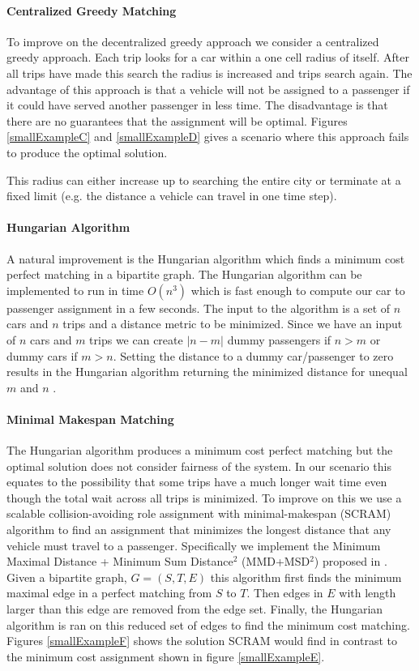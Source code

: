 \documentclass[letterpaper]{article}
\begin{document}
\paragraph{Centralized Greedy Matching}
To improve on the decentralized greedy approach we consider a centralized greedy approach. Each trip looks for a car within a one cell radius of itself. After all trips have made this search the radius is increased and trips search again. The advantage of this approach is that a vehicle will not be assigned to a passenger if it could have served another passenger in less time. The disadvantage is that there are no guarantees that the assignment will be optimal. Figures \ref{smallExampleC} and \ref{smallExampleD} gives a scenario where this approach fails to produce the optimal solution.

This radius can either increase up to searching the entire city or terminate at a fixed limit (e.g. the distance a vehicle can travel in one time step).

\paragraph{Hungarian Algorithm}
A natural improvement is the Hungarian algorithm \cite{kuhn1955hungarian} which finds a minimum cost perfect matching in a bipartite graph. The Hungarian algorithm can be implemented to run in time $O(n^3)$ which is fast enough to compute our car to passenger assignment in a few seconds. The input to the algorithm is a set of $n$ cars and $n$ trips and a distance metric to be minimized. Since we have an input of $n$ cars and $m$ trips we can create $|n-m|$ dummy passengers if $n > m$ or dummy cars if $m > n$. Setting the distance to a dummy car/passenger to zero results in the Hungarian algorithm returning the minimized distance for unequal $m$ and $n$ \cite{macalpine2015scram}.

\paragraph{Minimal Makespan Matching}
The Hungarian algorithm produces a minimum cost perfect matching but the optimal solution does not consider fairness of the system. In our scenario this equates to the possibility that some trips have a much longer wait time even though the total wait across all trips is minimized. To improve on this we use a scalable collision-avoiding role assignment with minimal-makespan (SCRAM) algorithm to find an assignment that minimizes the longest distance that any vehicle must travel to a passenger. Specifically we implement the Minimum Maximal Distance + Minimum Sum Distance$^2$ (MMD+MSD$^2$) proposed in \cite{macalpine2015scram}. Given a bipartite graph, $G = ({S,T},E)$  this algorithm first finds the minimum maximal edge in a perfect matching from $S$ to $T$. Then edges in $E$ with length larger than this edge are removed from the edge set. Finally, the Hungarian algorithm is ran on this reduced set of edges to find the minimum cost matching. Figures \ref{smallExampleF} shows the solution SCRAM would find in contrast to the minimum cost assignment shown in figure \ref{smallExampleE}. 
\end{document}

